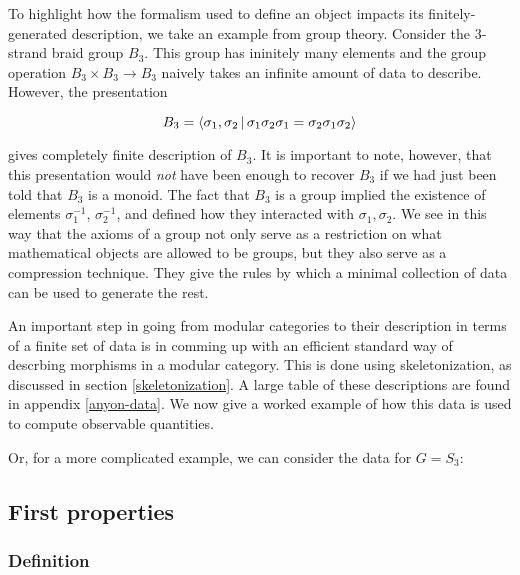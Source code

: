 \begin{ex}
To highlight how the formalism used to define an object impacts its finitely-generated description, we take an example from group theory. Consider the 3-strand braid group $B_3$. This group has ininitely many elements and the group operation $B_3\times B_3\to B_3$ naively takes an infinite amount of data to describe. However, the presentation

$$B_3=\Braket{\sigma_1, \sigma_2 | \sigma_1 \sigma_2 \sigma_1 = \sigma_2 \sigma_1 \sigma_2}$$

gives  completely finite description of $B_3$. It is important to note, however, that this presentation would {\em not} have been enough to recover $B_3$ if we had just been told that $B_3$ is a monoid. The fact that $B_3$ is a group implied the existence of elements $\sigma_1^{-1}$, $\sigma_{2}^{-1}$, and defined how they interacted with $\sigma_1,\sigma_2$. We see in this way that the axioms of a group not only serve as a restriction on what mathematical objects are allowed to be groups, but they also serve as a compression technique. They give the rules by which a minimal collection of data can be used to generate the rest.
\end{ex}


An important step in going from modular categories to their description in terms of a finite set of data is in comming up with an efficient standard way of descrbing morphisms in a modular category. This is done using skeletonization, as discussed in section \ref{skeletonization}. A large table of these descriptions are found in appendix \ref{anyon-data}. We now give a worked example of how this data is used to compute observable quantities.

\begin{ex}
\end{ex}

\begin{ex}
Or, for a more complicated example, we can consider the data for $G=S_3$:
\end{ex}

\subsection{First properties}

\subsubsection{Definition}

